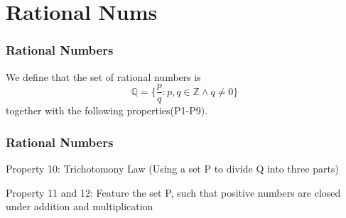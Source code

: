 \documentclass{beamer}
\begin{document}
\section{Rational Nums}
\begin{frame}
    \frametitle{Rational Numbers}
    \hspace{1em}
    We define that the set of rational numbers is
    \begin{equation*}
        \mathbb{Q}=\{\frac{p}{q}:p,q\in \mathbb{Z}\wedge q \neq 0\}
    \end{equation*}
    together with the following properties(P1-P9).
    \begin{table}
        \centering
    \end{table}
\end{frame}

\begin{frame}
    \frametitle{Rational Numbers}
    Property 10: Trichotomony Law (Using a set P to divide Q into three parts)

    Property 11 and 12: Feature the set P, such that positive numbers are closed under addition and multiplication
\end{frame}
\end{document}
